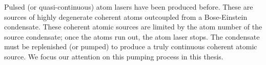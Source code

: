 Pulsed (or quasi-continuous) atom lasers have been produced before.  These are sources of highly degenerate coherent atoms outcoupled from a Bose-Einstein condensate.  These coherent atomic sources are limited by the atom number of the source condensate; once the atoms run out, the atom laser stops.  The condensate must be replenished (or pumped) to produce a truly continuous coherent atomic source.  We focus our attention on this pumping process in this thesis.








